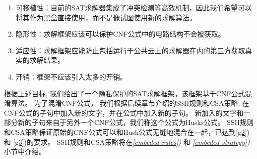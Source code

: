 \begin{enumerate}
 \item
可移植性：目前的SAT求解器集成了冲突检测等高效机制，因此我们希望可以将其作为黑盒直接使用，而不是像\cite{OBfuscationd-CNFs}试图使用新的求解算法。
 \item \label{g2}
隐形性\cite{obfuscationBible}：求解框架应该可以保护CNF公式中的电路结构不会被获取。
\item \label{g3}
适应性\cite{obfuscationBible}：求解框架应能防止包括运行于公共云上的求解器在内的第三方获取真实的求解结果。
 \item
开销：框架不应该引入太多的开销。
\end{enumerate}
%
%

根据上述目标,
我们给出了一个隐私保护的SAT求解框架，该框架基于CNF公式混淆算法。
为了混淆CNF公式，
我们根据后续章节介绍的SSH规则和CSA策略,
在CNF公式的子句中加入新的文字，并在公式中加入新的子句。
新加入的文字和一部分新的子句来自于另外一个CNF公式，我们称这个公式为Husks公式。
SSH规则和CSA策略保证原始的CNF公式可以和Husk公式无缝地混合在一起，已达到\ref{g2}) 和 \ref{g3})的要求。
SSH规则和CSA策略将在\textit{\ref{embeded rules})} 和 \textit{\ref{embeded strategy})} 小节中介绍。

%

